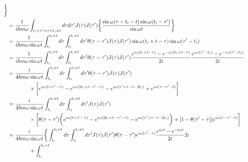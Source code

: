\begin{subequations}
\begin{align}
    \bigg\}
\notag\\&
    =
    \dfrac{1}{i \hbar m \omega}
    \int_{t_i < \tau' < \tau < t_i + t}
        d\tau d\tau'
    J(\tau) J(\tau')
    \bigg\{
    \dfrac{
        \sin \omega (\tau - t_i - t)
        \sin \omega (t_i - \tau')
    }{\sin \omega t}
    \bigg\}
\notag\\&
    =
    \dfrac{1}{i \hbar m \omega \sin \omega t}
    \int_{t_i}^{t_i + t}
        d\tau
    \int_{t_i}^{t_i + t}
        d\tau'
    \theta(\tau - \tau')
    J(\tau) J(\tau')
        \sin \omega (t_i + t - \tau)
        \sin \omega (\tau' - t_i)
\notag\\&
    =
    \dfrac{1}{i \hbar m \omega \sin \omega t}
    \int_{t_i}^{t_i + t}
        d\tau
    \int_{t_i}^{t_i + t}
        d\tau'
    \theta(\tau - \tau')
    J(\tau) J(\tau')
    \dfrac{
        e^{ i \omega (t_i + t - \tau) }
    -
        e^{ - i \omega (t_i + t - \tau) }
    }{2 i}
    \dfrac{
        e^{ i \omega (\tau' - t_i) }
    -
        e^{ - i \omega (\tau' - t_i) }
    }{2 i}
\notag\\&
    =
    \dfrac{i}{4 \hbar m \omega \sin \omega t}
    \int_{t_i}^{t_i + t}
        d\tau
    \int_{t_i}^{t_i + t}
        d\tau'
    \theta(\tau - \tau')
    J(\tau) J(\tau')
\notag\\&\qquad\qquad
    \times
    \bigg[
        e^{ i \omega (t + \tau' - \tau) }
    -
        e^{ i \omega (2 t_i + t - \tau' - \tau) }
    -
        e^{ i \omega (\tau' + \tau - t - 2 t_i) }
    +
        e^{ i \omega (\tau - \tau' - t) }
    \bigg]
\notag\\&
    =
    \dfrac{i}{4 \hbar m \omega \sin \omega t}
    \int_{t_i}^{t_i + t}
        d\tau
    \int_{t_i}^{t_i + t}
        d\tau'
    J(\tau) J(\tau')
\notag\\&\qquad\qquad
    \times
    \bigg[
    \theta(\tau - \tau')
    \bigg(
        e^{ i \omega (t + \tau' - \tau) }
    -
        e^{ i \omega (2 t_i + t - \tau' - \tau) }
    -
        e^{ i \omega (\tau' + \tau - t - 2 t_i) }
    \bigg)
    +
    [ 1 - \theta(\tau' - \tau) ]
        e^{ i \omega (\tau - \tau' - t) }
    \bigg]
\notag\\&
    =
    \dfrac{i}{4 \hbar m \omega \sin \omega t}
    \bigg\{
    \int_{t_i}^{t_i + t}
        d\tau
    \int_{t_i}^{t_i + t}
        d\tau'
    J(\tau) J(\tau')
    \theta(\tau - \tau')
        e^{ i \omega (\tau' - \tau) }
    \dfrac{
        e^{ i \omega t }
    -
        e^{ - i \omega t }
    }{2 i}
    2 i
\notag\\&\qquad\qquad
    +
    \int_{t_i}^{t_i + t}

\end{align}
\end{subequations}
